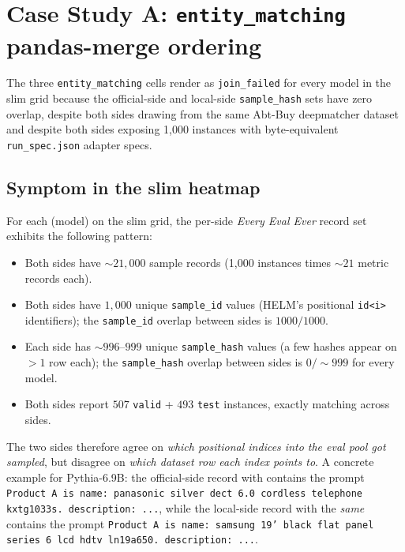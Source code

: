 \documentclass[11pt]{article}
\newcommand{\eee}{\textit{Every Eval Ever}\xspace}
\begin{document}
\section{Case Study A: \texorpdfstring{\texttt{entity\_matching}}{entity\_matching} pandas-merge ordering}
\label{sec:tr-case-a}

The three \texttt{entity\_matching} cells render as
  \texttt{join\_failed} for every model in the slim grid because the
  official-side and local-side \texttt{sample\_hash} sets have zero
  overlap, despite both sides drawing from the same Abt-Buy
  deepmatcher dataset and despite both sides exposing 1{,}000 instances
  with byte-equivalent \texttt{run\_spec.json} adapter specs.

\subsection{Symptom in the slim heatmap}
\label{sec:tr-case-a-symptom}

For each (model) on the slim grid, the per-side \eee{} record set
  exhibits the following pattern:

\begin{itemize}
  \item Both sides have $\sim 21{,}000$ sample records (1{,}000
        instances times $\sim 21$ metric records each).
  \item Both sides have $1{,}000$ unique \texttt{sample\_id} values
        (HELM's positional \texttt{id<i>} identifiers); the
        \texttt{sample\_id} overlap between sides is $1000/1000$.
  \item Each side has $\sim 996$--$999$ unique
        \texttt{sample\_hash} values (a few hashes appear on
        $> 1$ row each); the \texttt{sample\_hash} overlap between
        sides is $0/\sim999$ for every model.
  \item Both sides report $507$ \texttt{valid} + $493$ \texttt{test}
        instances, exactly matching across sides.
\end{itemize}

The two sides therefore agree on \emph{which positional indices into
  the eval pool got sampled}, but disagree on \emph{which dataset row
  each index points to}.
A concrete example for Pythia-6.9B: the official-side record with
   contains the prompt
  \texttt{Product A is name: panasonic silver dect 6.0 cordless telephone kxtg1033s.~description:~...},
  while the local-side record with the \emph{same}
   contains the prompt
  \texttt{Product A is name: samsung 19' black flat panel series 6 lcd hdtv ln19a650.~description:~...}.
\end{document}
